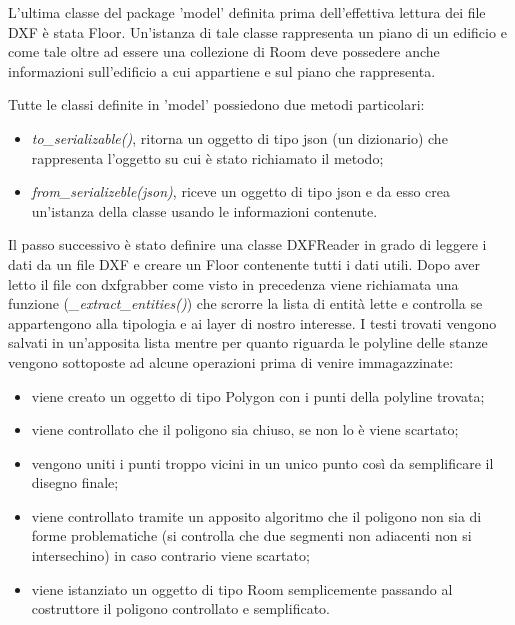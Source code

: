 \documentclass[12pt]{report}
\begin{document}
L'ultima classe del package 'model' definita prima dell'effettiva lettura dei file DXF è stata Floor. Un'istanza di tale classe rappresenta un piano di un edificio e come tale oltre ad essere una collezione di Room deve possedere anche informazioni sull'edificio a cui appartiene e sul piano che rappresenta.

Tutte le classi definite in 'model' possiedono due metodi particolari:
\begin{itemize}
\item \textit{to\_serializable()}, ritorna un oggetto di tipo json (un dizionario) che rappresenta l'oggetto su cui è stato richiamato il metodo;
\item \textit{from\_serializeble(json)}, riceve un oggetto di tipo json e da esso crea un'istanza della classe usando le informazioni contenute.
\end{itemize}

\vspace{5mm} %

Il passo successivo è stato definire una classe DXFReader in grado di leggere i dati da un file DXF e creare un Floor contenente tutti i dati utili.
Dopo aver letto il file con dxfgrabber come visto in precedenza viene richiamata una funzione (\textit{\_extract\_entities()}) che scrorre la lista di entità lette e controlla se appartengono alla tipologia e ai layer di nostro interesse.
I testi trovati vengono salvati in un'apposita lista mentre per quanto riguarda le polyline delle stanze vengono sottoposte ad alcune operazioni prima di venire immagazzinate:
\begin{itemize}
\item viene creato un oggetto di tipo Polygon con i punti della polyline trovata;
\item viene controllato che il poligono sia chiuso, se non lo è viene scartato;
\item vengono uniti i punti troppo vicini in un unico punto così da semplificare il disegno finale;
\item viene controllato tramite un apposito algoritmo che il poligono non sia di forme problematiche (si controlla che due segmenti non adiacenti non si intersechino) in caso contrario viene scartato;
\item viene istanziato un oggetto di tipo Room semplicemente passando al costruttore il poligono controllato e semplificato.
\end{itemize}
\end{document}
